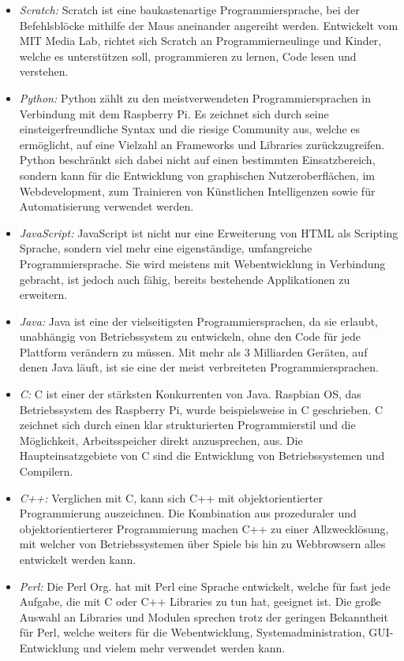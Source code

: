 \begin{itemize}
  \item \textit{Scratch: }Scratch ist eine baukastenartige Programmiersprache, bei der Befehlsblöcke mithilfe der Maus aneinander angereiht werden. Entwickelt vom MIT Media Lab, richtet sich Scratch an Programmierneulinge und Kinder, welche es unterstützen soll, programmieren zu lernen, Code lesen und verstehen.
  \item \textit{Python: }Python zählt zu den meistverwendeten Programmiersprachen in Verbindung mit dem Raspberry Pi. Es zeichnet sich durch seine einsteigerfreundliche Syntax und die riesige Community aus, welche es ermöglicht, auf eine Vielzahl an Frameworks und Libraries zurückzugreifen. Python beschränkt sich dabei nicht auf einen bestimmten Einsatzbereich, sondern kann für die Entwicklung von graphischen Nutzeroberflächen, im Webdevelopment, zum Trainieren von Künstlichen Intelligenzen sowie für Automatisierung verwendet werden.
  \item \textit{JavaScript: } JavaScript ist nicht nur eine Erweiterung von HTML als Scripting Sprache, sondern viel mehr eine eigenständige, umfangreiche Programmiersprache. Sie wird meistens mit Webentwicklung in Verbindung gebracht, ist jedoch auch fähig, bereits bestehende Applikationen zu erweitern.
  \item \textit{Java: } Java ist eine der vielseitigsten Programmiersprachen, da sie erlaubt, unabhängig von Betriebssystem zu entwickeln, ohne den Code für jede Plattform verändern zu müssen. Mit mehr als 3 Milliarden Geräten, auf denen Java läuft, ist sie eine der meist verbreiteten Programmiersprachen.
  \item \textit{C: } C ist einer der stärksten Konkurrenten von Java. Raspbian OS, das Betriebssystem des Raspberry Pi, wurde beispielsweise in C geschrieben. C zeichnet sich durch einen klar strukturierten Programmierstil und die Möglichkeit, Arbeitsspeicher direkt anzusprechen, aus. Die Haupteinsatzgebiete von C sind die Entwicklung von Betriebssystemen und Compilern.
  \item \textit{C++: } Verglichen mit C, kann sich C++ mit objektorientierter Programmierung auszeichnen. Die Kombination aus prozeduraler und objektorientierterer Programmierung machen C++ zu einer Allzwecklösung, mit welcher von Betriebssystemen über Spiele bis hin zu Webbrowsern alles entwickelt werden kann.
  \item \textit{Perl: } Die Perl Org. hat mit Perl eine Sprache entwickelt, welche für fast jede Aufgabe, die mit C oder C++ Libraries zu tun hat, geeignet ist. Die große Auswahl an Libraries und Modulen sprechen trotz der geringen Bekanntheit für Perl, welche weiters für die Webentwicklung, Systemadministration, GUI-Entwicklung und vielem mehr verwendet werden kann.

\end{itemize}
